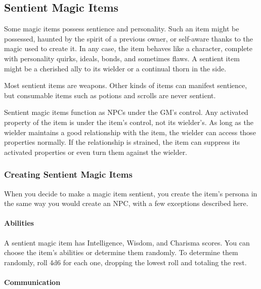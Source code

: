\documentclass[
]{article}
\begin{document}
\hypertarget{sentient-magic-items}{%
\subsection{Sentient Magic Items}\label{sentient-magic-items}}

Some magic items possess sentience and personality. Such an item might
be possessed, haunted by the spirit of a previous owner, or self-aware
thanks to the magic used to create it. In any case, the item behaves
like a character, complete with personality quirks, ideals, bonds, and
sometimes flaws. A sentient item might be a cherished ally to its
wielder or a continual thorn in the side.

Most sentient items are weapons. Other kinds of items can manifest
sentience, but consumable items such as potions and scrolls are never
sentient.

Sentient magic items function as NPCs under the GM's control. Any
activated property of the item is under the item's control, not its
wielder's. As long as the wielder maintains a good relationship with the
item, the wielder can access those properties normally. If the
relationship is strained, the item can suppress its activated properties
or even turn them against the wielder.

\hypertarget{creating-sentient-magic-items}{%
\subsubsection{Creating Sentient Magic
Items}\label{creating-sentient-magic-items}}

When you decide to make a magic item sentient, you create the item's
persona in the same way you would create an NPC, with a few exceptions
described here.

\hypertarget{abilities}{%
\paragraph{Abilities}\label{abilities}}

A sentient magic item has Intelligence, Wisdom, and Charisma scores. You
can choose the item's abilities or determine them randomly. To determine
them randomly, roll 4d6 for each one, dropping the lowest roll and
totaling the rest.

\hypertarget{communication}{%
\paragraph{Communication}\label{communication}}
\end{document}
